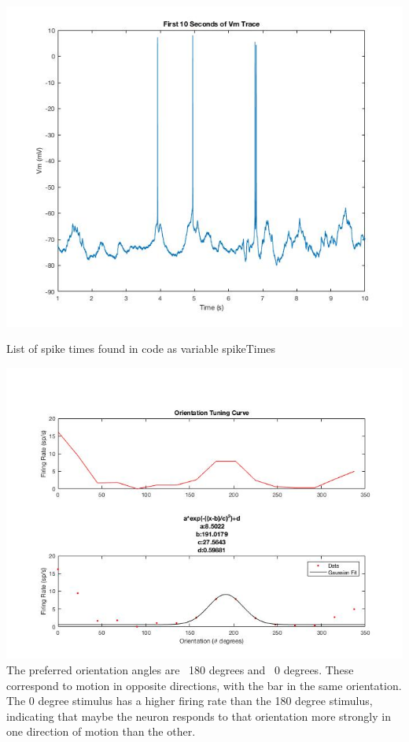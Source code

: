 \documentclass{121Temp}
\begin{document}
\maketitle

\hwproblem
\label{Qa}
\includegraphics[scale=.5]{vm_sample_trace}


\hwproblem

List of spike times found in code as variable spikeTimes



\hwproblem
\includegraphics[scale=.75]{tuning_curve}
The preferred orientation angles are ~180 degrees and ~0 degrees. These correspond to motion in opposite directions, with the bar in the same orientation. The 0 degree stimulus has a higher firing rate than the 180 degree stimulus, indicating that maybe the neuron responds to that orientation more strongly in one direction of motion than the other. 
\end{document}
